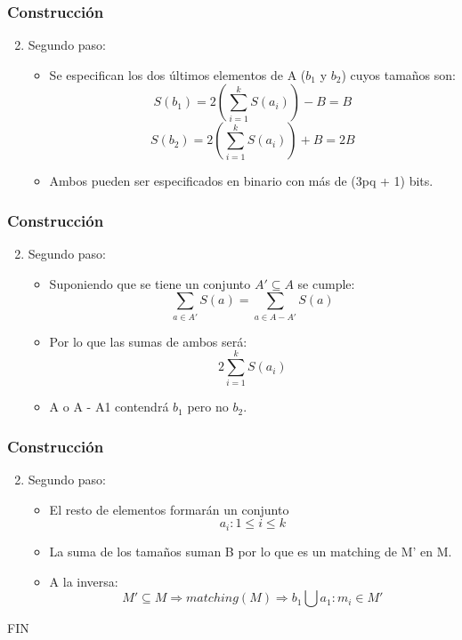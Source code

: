 \documentclass{beamer}
\begin{document}

\begin{frame}
\frametitle{Construcci\'on}
\begin{enumerate}
\setcounter{enumi}{1}
\item Segundo paso:
\begin{itemize}
\item Se especifican los dos \'ultimos elementos de A ($b_{1}$ y $b_{2}$) cuyos tama\~{n}os son:
	$$S(b_{1}) = 2(\sum\limits_{i=1}^{k}S(a_{i})) - B = B$$
    $$S(b_{2}) = 2(\sum\limits_{i=1}^{k}S(a_{i})) + B = 2B$$
\item Ambos pueden ser especificados en binario con m\'as de (3pq + 1) bits.
\end{itemize}

\end{enumerate}

\end{frame}


\begin{frame}
\frametitle{Construcci\'on}
\begin{enumerate}
\setcounter{enumi}{1}
\item Segundo paso:
\begin{itemize}
\item Suponiendo que se tiene un conjunto $A' \subseteq A$ se cumple:
	$$\sum\limits_{a \in A'} S(a) = \sum\limits_{a \in A - A'} S(a)$$
\item Por lo que las sumas de ambos ser\'a:
	$$ 2\sum\limits_{i=1}^{k}S(a_{i})$$
 \item A o A - A1 contendr\'a $b_{1}$ pero no $b_{2}$.
\end{itemize}

\end{enumerate}

\end{frame}


\begin{frame}
\frametitle{Construcci\'on}
\begin{enumerate}
\setcounter{enumi}{1}
\item Segundo paso:
\begin{itemize}
\item El resto de elementos formar\'an un conjunto 
	$$a_{i}: 1 \leq i \leq k$$
\item La suma de los tama\~{n}os suman B por lo que es un matching de M' en M.
\item A la inversa:
	$$M' \subseteq M \Rightarrow matching(M) \Rightarrow {b_{1} \bigcup {a_{1}}: m_{i} \in M'} $$
\end{itemize}

\end{enumerate}

\end{frame}


\begin{frame}
\Huge{\centerline{FIN}}
\end{frame}

\end{document}

